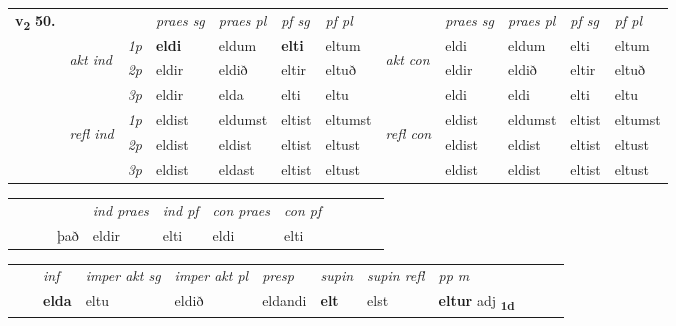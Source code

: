 \begin{tabular}{llllllllllll} \toprule
\multirow{4}{*}{{{\textbf{v{\textsubscript{2}}} \Large{\textbf{50.}}}}}  & &   &  \textit{praes sg}  & \textit{praes pl}  &\textit{ pf sg} & \textit{pf pl} &  &  \textit{praes sg}  & \textit{praes pl}  & \textit{pf sg} & \textit{pf pl } \\*
	\cmidrule{4-7} \cmidrule{9-12}
 & \multirow{3}{*}{\begin{turn}{90}\textit{akt ind}\end{turn}} & {\textit{1p}} & \textbf{eldi} & eldum    & \textbf{elti} & eltum & \multirow{3}{*}{\begin{turn}{90}\textit{akt con}\end{turn}} &eldi & eldum & elti & eltum\\*
& &  {\textit{2p}} &  eldir  & eldið   & eltir & eltuð & & eldir & eldið & eltir & eltuð \\*
& &  {\textit{3p}} & eldir & elda   & elti & eltu & & eldi & eldi& elti & eltu  \\*
\cmidrule{4-7} \cmidrule{9-12}
 &\multirow{3}{*}{\begin{turn}{90}\textit{refl ind}\end{turn}} & {\textit{1p}} & eldist & eldumst    & eltist & eltumst & \multirow{3}{*}{\begin{turn}{90}\textit{refl con}\end{turn}}  &eldist & eldumst & eltist & eltumst\\*
 &&  {\textit{2p}} &  eldist  & eldist   & eltist & eltust & &eldist & eldist & eltist & eltust \\*
& &  {\textit{3p}} & eldist & eldast   & eltist & eltust & & eldist & eldist& eltist & eltust  \\*
\cmidrule{4-7} \cmidrule{9-12}
\end{tabular}


\begin{tabular}{llllllllllll}
 & &  & &  \textit{ind praes} & \textit{ind pf} & \textit{con praes} & \textit{con pf} \\*
&  & & það & eldir & elti & eldi & elti \\*
\cmidrule{5-9}
\end{tabular}


\begin{tabular}{llllllllllll}
 & & \textit{inf} & \textit{imper akt sg} & \textit{imper akt pl}   & \textit{presp} & \textit{supin} & \textit{supin refl} & \textit{pp m}     \\*
  & & \textbf{elda} & eltu  & eldið   & eldandi &  \textbf{elt} & elst & \textbf{eltur} adj \textbf{\textsubscript{1d}} \\*
\cmidrule{1-12}
\end{tabular}



